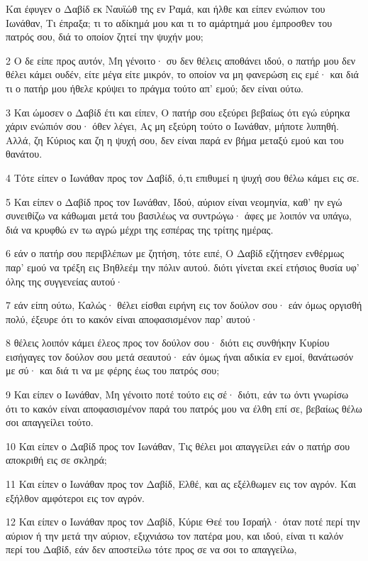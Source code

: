 \par Και έφυγεν ο Δαβίδ εκ Ναυϊώθ της εν Ραμά, και ήλθε και είπεν ενώπιον του Ιωνάθαν, Τι έπραξα; τι το αδίκημά μου και τι το αμάρτημά μου έμπροσθεν του πατρός σου, διά το οποίον ζητεί την ψυχήν μου;
\par 2 Ο δε είπε προς αυτόν, Μη γένοιτο· συ δεν θέλεις αποθάνει ιδού, ο πατήρ μου δεν θέλει κάμει ουδέν, είτε μέγα είτε μικρόν, το οποίον να μη φανερώση εις εμέ· και διά τι ο πατήρ μου ήθελε κρύψει το πράγμα τούτο απ' εμού; δεν είναι ούτω.
\par 3 Και ώμοσεν ο Δαβίδ έτι και είπεν, Ο πατήρ σου εξεύρει βεβαίως ότι εγώ εύρηκα χάριν ενώπιόν σου· όθεν λέγει, Ας μη εξεύρη τούτο ο Ιωνάθαν, μήποτε λυπηθή. Αλλά, ζη Κύριος και ζη η ψυχή σου, δεν είναι παρά εν βήμα μεταξύ εμού και του θανάτου.
\par 4 Τότε είπεν ο Ιωνάθαν προς τον Δαβίδ, ό,τι επιθυμεί η ψυχή σου θέλω κάμει εις σε.
\par 5 Και είπεν ο Δαβίδ προς τον Ιωνάθαν, Ιδού, αύριον είναι νεομηνία, καθ' ην εγώ συνειθίζω να κάθωμαι μετά του βασιλέως να συντρώγω· άφες με λοιπόν να υπάγω, διά να κρυφθώ εν τω αγρώ μέχρι της εσπέρας της τρίτης ημέρας.
\par 6 εάν ο πατήρ σου περιβλέπων με ζητήση, τότε ειπέ, Ο Δαβίδ εζήτησεν ενθέρμως παρ' εμού να τρέξη εις Βηθλεέμ την πόλιν αυτού. διότι γίνεται εκεί ετήσιος θυσία υφ' όλης της συγγενείας αυτού·
\par 7 εάν είπη ούτω, Καλώς· θέλει είσθαι ειρήνη εις τον δούλον σου· εάν όμως οργισθή πολύ, έξευρε ότι το κακόν είναι αποφασισμένον παρ' αυτού·
\par 8 θέλεις λοιπόν κάμει έλεος προς τον δούλον σου· διότι εις συνθήκην Κυρίου εισήγαγες τον δούλον σου μετά σεαυτού· εάν όμως ήναι αδικία εν εμοί, θανάτωσόν με σύ· και διά τι να με φέρης έως του πατρός σου;
\par 9 Και είπεν ο Ιωνάθαν, Μη γένοιτο ποτέ τούτο εις σέ· διότι, εάν τω όντι γνωρίσω ότι το κακόν είναι αποφασισμένον παρά του πατρός μου να έλθη επί σε, βεβαίως θέλω σοι απαγγείλει τούτο.
\par 10 Και είπεν ο Δαβίδ προς τον Ιωνάθαν, Τις θέλει μοι απαγγείλει εάν ο πατήρ σου αποκριθή εις σε σκληρά;
\par 11 Και είπεν ο Ιωνάθαν προς τον Δαβίδ, Ελθέ, και ας εξέλθωμεν εις τον αγρόν. Και εξήλθον αμφότεροι εις τον αγρόν.
\par 12 Και είπεν ο Ιωνάθαν προς τον Δαβίδ, Κύριε Θεέ του Ισραήλ· όταν ποτέ περί την αύριον ή την μετά την αύριον, εξιχνιάσω τον πατέρα μου, και ιδού, είναι τι καλόν περί του Δαβίδ, εάν δεν αποστείλω τότε προς σε να σοι το απαγγείλω,
